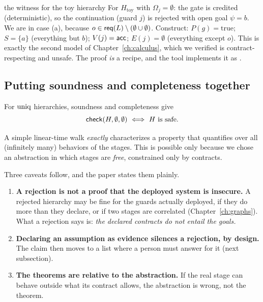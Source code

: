 \begin{example}{the witness for the toy hierarchy}
For $H_{\mathrm{toy}}$ with $\Omega_j=\emptyset$: the gate is credited (deterministic), so the continuation (guard $j$) is rejected with open goal $\psi=b$. We are in case (a), because $o\in\mathsf{req}(L)\setminus(\emptyset\cup\emptyset)$. Construct: $P(g)=\text{true}$; $S=\{a\}$ (everything but $b$); $V(j)=\mathsf{acc}$; $E(j)=\emptyset$ (everything except $o$). This is exactly the second model of Chapter~\ref{ch:calculus}, which we verified is contract-respecting and unsafe. The proof \emph{is} a recipe, and the tool implements it as .
\end{example}

\subsection{Putting soundness and completeness together}

For $\mathrm{uniq}$ hierarchies, soundness and completeness give
\[
\chk(H,\emptyset,\emptyset)\ \Longleftrightarrow\ H\text{ is safe}.
\]

\begin{bigidea}
A simple linear-time walk \emph{exactly} characterizes a property that quantifies over all (infinitely many) behaviors of the stages. This is possible only because we chose an abstraction in which stages are \emph{free}, constrained only by contracts.
\end{bigidea}

Three caveats follow, and the paper states them plainly.

\begin{enumerate}
\item \textbf{A rejection is not a proof that the deployed system is insecure.} A rejected hierarchy may be fine for the guards actually deployed, if they do more than they declare, or if two stages are correlated (Chapter~\ref{ch:graphs}). What a rejection says is: \emph{the declared contracts do not entail the goals.}
\item \textbf{Declaring an assumption as evidence silences a rejection, by design.} The claim then moves to a list where a person must answer for it (next subsection).
\item \textbf{The theorems are relative to the abstraction.} If the real stage can behave outside what its contract allows, the abstraction is wrong, not the theorem.
\end{enumerate}

